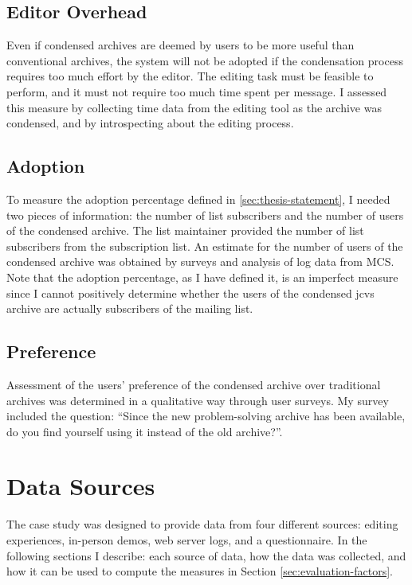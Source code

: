 \subsection{Editor Overhead}
Even if condensed archives are deemed by users to be more useful than
conventional archives, the system will not be adopted if the condensation
process requires too much effort by the editor. The editing task must be
feasible to perform, and it must not require too much time spent per message. I
assessed this measure by collecting time data from the editing tool as the
archive was condensed, and by introspecting about the editing process.

\subsection{Adoption}
To measure the adoption percentage defined in \ref{sec:thesis-statement}, I
needed two pieces of information: the number of list subscribers and the number
of users of the condensed archive. The list maintainer provided the number of
list subscribers from the subscription list. An estimate for the number of
users of the condensed archive was obtained by surveys and analysis of log data
from MCS. Note that the adoption percentage, as I have defined it, is an
imperfect measure since I cannot positively determine whether the users of the
condensed jcvs archive are actually subscribers of the mailing list.

\subsection{Preference}
Assessment of the users' preference of the condensed archive over traditional
archives was determined in a qualitative way through user surveys. My survey
included the question: ``Since the new problem-solving archive has been
available, do you find yourself using it instead of the old archive?''.

\section{Data Sources}
\label{sec:data-sources}
The case study was designed to provide data from four different sources:
editing experiences, in-person demos, web server logs, and a questionnaire. In
the following sections I describe: each source of data, how the data was
collected, and how it can be used to compute the measures in Section
\ref{sec:evaluation-factors}.

